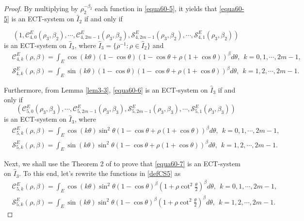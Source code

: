 \documentclass[11pt]{amsart}
\theoremstyle{remark}
\theoremstyle{definition}
\begin{document}
\begin{proof}
By multiplying   by $\rho_2^{-\beta_2}$ each function in \eqref{equa60-5}, it yields that  \eqref{equa60-5} is  an ECT-system on   $\hat{I}_2$ if and only if

\begin{equation} \label{equa60-6}\left(1, \mathcal{C}_{4,0}^{E}(\rho_3,\beta_2), \cdots, \mathcal{C}_{4,2m-1}^{E}(\rho_3,\beta_2), \mathcal{S}_{4,2m-1}^{E}(\rho_3,\beta_2), \cdots, \mathcal{S}_{4,1}^{E}(\rho_3,\beta_2)\right) \end{equation}
is  an ECT-system on   $\hat{I}_3$,  where $\hat{I}_3=\{ \rho^{-1}:  \rho\in \hat{I}_2 \}$ and
\begin{equation*}
\begin{split}
&\mathcal{C}_{4,k}^{E}(\rho,\beta)=\int_{E}\cos (k\theta)(1-\cos \theta)\left(1-\cos\theta+\rho(1+\cos\theta)\right)^{\beta}d\theta,\ \ k=0,1, \cdots, 2m-1, \\
&\mathcal{S}_{4,k}^{E}(\rho,\beta)=\int_{E}\sin (k\theta)(1-\cos \theta)\left(1-\cos\theta+\rho(1+\cos\theta)\right)^{\beta}d\theta, \ \ k=1, 2,  \cdots, 2m-1.
\end{split}
\end{equation*}


 Furthermore,   from  Lemma \ref{lem3-3},   \eqref{equa60-6} is  an ECT-system on   $\hat{I}_3$ if and only if
 \begin{equation} \label{equa60-7}\left(\mathcal{C}_{5,0}^{E}(\rho_3,\beta_3), \cdots, \mathcal{C}_{5,2m-1}^{E}(\rho_3,\beta_3), \mathcal{S}_{5,2m-1}^{E}(\rho_3,\beta_3), \cdots, \mathcal{S}_{5,1}^{E}(\rho_3,\beta_3)\right) \end{equation}
is  an ECT-system on   $\hat{I}_3$,
where
\begin{equation}\label{defCS5}
\begin{split}
&\mathcal{C}_{5,k}^{E}(\rho,\beta)=\int_{E}\cos (k\theta)\sin^2 \theta\left(1-\cos\theta+\rho(1+\cos\theta)\right)^{\beta}d\theta, \ \ k=0,1, \cdots, 2m-1, \\
&\mathcal{S}_{5,k}^{E}(\rho,\beta)=\int_{E}\sin (k\theta)\sin^2 \theta\left(1-\cos\theta+\rho(1+\cos\theta)\right)^{\beta}d\theta, \ \ k=1, 2,  \cdots, 2m-1.
\end{split}
\end{equation}



Next, we shall use the Theorem 2 of \cite{HLZ2023} to  prove that \eqref{equa60-7} is  an ECT-system on   $\hat{I}_3$. To this end, let's rewrite the functions   in \eqref{defCS5} as
\begin{equation*}\label{defCS6}
\begin{split}
&\mathcal{C}_{5,k}^{E}(\rho,\beta)=\int_{E}\cos (k\theta)\sin^2\theta (1-\cos\theta)^\beta\left(1+\rho \cot^2\frac{\theta}{2}\right)^{\beta}d\theta, \ \ k=0,1, \cdots, 2m-1, \\
&\mathcal{S}_{5,k}^{E}(\rho,\beta)=\int_{E}\sin (k\theta)\sin^2\theta (1-\cos\theta)^\beta\left(1+\rho \cot^2\frac{\theta}{2}\right)^{\beta}d\theta, \ \ k=1, 2,  \cdots, 2m-1.
\end{split}
\end{equation*}


\end{proof}
\end{document}
